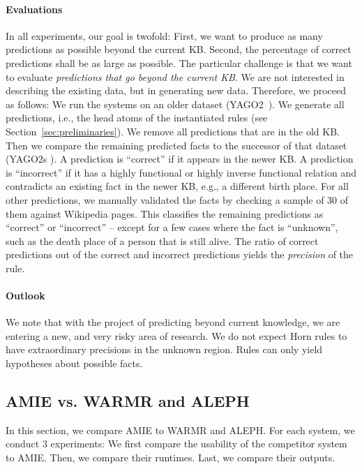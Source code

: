 \paragraph{Evaluations} In all experiments, our goal is twofold: First, we want to produce as many predictions as possible beyond the current KB. 
Second, the percentage of correct predictions shall be as large as possible.
The particular challenge is that we want to evaluate \emph{predictions that go beyond the current KB}. We are not interested in describing the existing data, but in generating new data.
Therefore, we proceed as follows: We run the systems on an older dataset (YAGO2~\cite{yago2}). We generate all predictions, i.e., the head atoms of the instantiated rules (see Section~\ref{sec:preliminaries}). We remove all predictions that are in the old KB.
Then we compare the remaining predicted facts to the successor of that dataset (YAGO2s \cite{yago2s}). A prediction is ``correct'' if it appears in the newer KB. A prediction is ``incorrect'' if it has a highly functional or highly inverse functional relation and contradicts an existing fact in the newer KB, e.g., a different birth place.
For all other predictions, we manually validated the facts by checking a sample of 30 of them against Wikipedia pages. This classifies the remaining predictions as ``correct'' or ``incorrect'' -- except for a few cases where the fact is ``unknown'', such as the death place of a person that is still alive. The ratio of correct predictions out of the correct and incorrect predictions yields the \emph{precision} of the rule.

\paragraph{Outlook} We note that with the project of predicting beyond current knowledge, we are entering a new, and very risky area of research. We do not expect Horn rules to have extraordinary precisions in the unknown region. Rules can only yield hypotheses about possible facts. 

\subsection{AMIE vs. WARMR and ALEPH}
\noindent In this section, we compare AMIE to WARMR and ALEPH. For each system, we conduct 3 experiments: We first compare the usability of the competitor system to AMIE. Then, we compare their runtimes. Last, we compare their outputs.%

